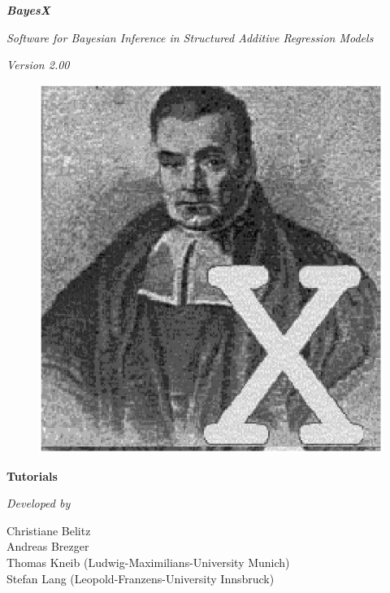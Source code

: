 \documentclass[11pt,a4paper,twoside]{bayesxreport}
\begin{document}
\MakeShortVerb{\|}

\thispagestyle{empty}

\begin{center}
{\bf \em \huge BayesX}

\vspace{0.5cm}

{\em \large Software for Bayesian Inference in Structured Additive
Regression Models}

\vspace{0.5cm}

{\em Version 2.00}

\vspace{0.5cm}

\begin{figure}[h]
\begin{center}
\includegraphics[scale=1.2]{grafiken/bayesicon.eps}
\end{center}
\end{figure}

\vfill

{\bf\sffamily \huge Tutorials}

\vfill

\end{center}

{\em Developed by}

Christiane Belitz\\
Andreas Brezger\\
Thomas Kneib (Ludwig-Maximilians-University Munich)\\
Stefan Lang (Leopold-Franzens-University Innsbruck)
\end{document}
